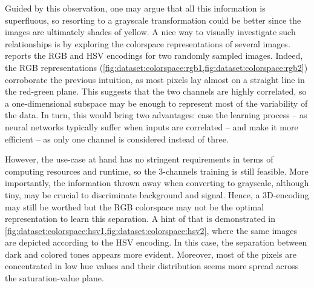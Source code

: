 Guided by this observation, one may argue that all this information is superfluous, so resorting to a grayscale transformation could be better since the images are ultimately shades of yellow.
A nice way to visually investigate such relationships is by exploring the colorspace representations of several images.
 reports the RGB and HSV encodings for two randomly sampled images.
Indeed, the RGB representations (\cref{fig:dataset:colorspace:rgb1,fig:dataset:colorspace:rgb2}) corroborate the previous intuition, as most pixels lay almost on a straight line in the red-green plane. 
This suggests that the two channels are highly correlated, so a one-dimensional subspace may be enough to represent most of the variability of the data.
In turn, this would bring two advantages: ease the learning process -- as neural networks typically suffer when inputs are correlated %
-- and make it more efficient -- as only one channel is considered instead of three.

However, the use-case at hand has no stringent requirements in terms of computing resources and runtime, so the 3-channels training is still feasible.
More importantly, the information thrown away when converting to grayscale, although tiny, may be crucial to discriminate background and signal. 
Hence, a 3D-encoding may still be worthed but the RGB colorspace may not be the optimal representation to learn this separation. A hint of that is demonstrated in \cref{fig:dataset:colorspace:hsv1,fig:dataset:colorspace:hsv2}, where the same images are depicted according to the HSV encoding. 
In this case, the separation between dark and colored tones appears more evident. 
Moreover, most of the pixels are concentrated in low hue values
and their distribution seems more spread across the saturation-value plane. 

